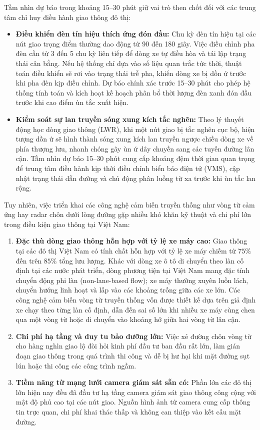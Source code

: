 Tầm nhìn dự báo trong khoảng 15--30 phút giữ vai trò then chốt đối với các trung tâm chỉ huy điều hành giao thông đô thị:
\begin{itemize}
    \item \textbf{Điều khiển đèn tín hiệu thích ứng đón đầu:} Chu kỳ đèn tín hiệu tại các nút giao trọng điểm thường dao động từ 90 đến 180 giây. Việc điều chỉnh pha đèn cần từ 3 đến 5 chu kỳ liên tiếp để dòng xe tự điều hòa và tái lập trạng thái cân bằng. Nếu hệ thống chỉ dựa vào số liệu quan trắc tức thời, thuật toán điều khiển sẽ rơi vào trạng thái trễ pha, khiến dòng xe bị dồn ứ trước khi pha đèn kịp điều chỉnh. Dự báo chính xác trước 15--30 phút cho phép hệ thống tính toán và kích hoạt kế hoạch phân bổ thời lượng đèn xanh đón đầu trước khi cao điểm ùn tắc xuất hiện.
    \item \textbf{Kiểm soát sự lan truyền sóng xung kích tắc nghẽn:} Theo lý thuyết động học dòng giao thông (LWR), khi một nút giao bị tắc nghẽn cục bộ, hiện tượng dồn ứ sẽ hình thành sóng xung kích lan truyền ngược chiều dòng xe về phía thượng lưu, nhanh chóng gây ùn ứ dây chuyền sang các tuyến đường lân cận. Tầm nhìn dự báo 15--30 phút cung cấp khoảng đệm thời gian quan trọng để trung tâm điều hành kịp thời điều chỉnh biển báo điện tử (VMS), cập nhật trạng thái dẫn đường và chủ động phân luồng từ xa trước khi ùn tắc lan rộng.
\end{itemize}

Tuy nhiên, việc triển khai các công nghệ cảm biến truyền thống như vòng từ cảm ứng hay radar chôn dưới lòng đường gặp nhiều khó khăn kỹ thuật và chi phí lớn trong điều kiện giao thông tại Việt Nam:
\begin{enumerate}
    \item \textbf{Đặc thù dòng giao thông hỗn hợp với tỷ lệ xe máy cao:} Giao thông tại các đô thị Việt Nam có tính chất hỗn hợp với tỷ lệ xe máy chiếm từ $75\%$ đến trên $85\%$ tổng lưu lượng. Khác với dòng xe ô tô di chuyển theo làn cố định tại các nước phát triển, dòng phương tiện tại Việt Nam mang đặc tính chuyển động phi làn (non-lane-based flow); xe máy thường xuyên luồn lách, chuyển hướng linh hoạt và lấp vào các khoảng trống giữa các xe lớn. Các công nghệ cảm biến vòng từ truyền thống vốn được thiết kế dựa trên giả định xe chạy theo từng làn cố định, dẫn đến sai số lớn khi nhiều xe máy cùng chen qua một vòng từ hoặc di chuyển vào khoảng hở giữa hai vòng từ lân cận.
    \item \textbf{Chi phí hạ tầng và duy tu bảo dưỡng lớn:} Việc xẻ đường chôn vòng từ cho hàng nghìn giao lộ đòi hỏi kinh phí đầu tư ban đầu rất lớn, làm gián đoạn giao thông trong quá trình thi công và dễ bị hư hại khi mặt đường sụt lún hoặc thi công các công trình ngầm.
    \item \textbf{Tiềm năng từ mạng lưới camera giám sát sẵn có:} Phần lớn các đô thị lớn hiện nay đều đã đầu tư hạ tầng camera giám sát giao thông công cộng với mật độ phủ cao tại các nút giao. Nguồn hình ảnh từ camera cung cấp thông tin trực quan, chi phí khai thác thấp và không can thiệp vào kết cấu mặt đường.
\end{enumerate}

